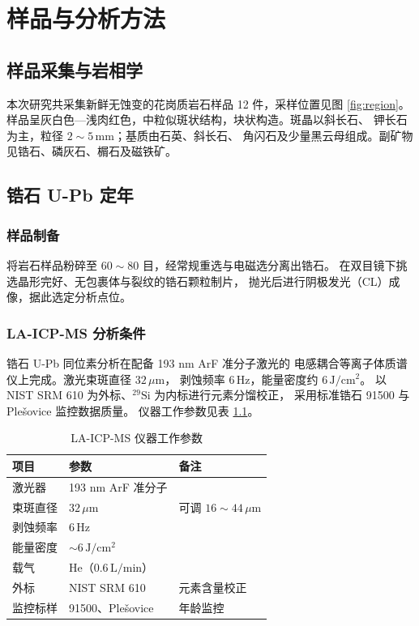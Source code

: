 \documentclass[master]{cugthesis}
\begin{document}
\chapter{样品与分析方法}

\section{样品采集与岩相学}

本次研究共采集新鲜无蚀变的花岗质岩石样品 12 件，采样位置见图 \ref{fig:region}。
样品呈灰白色—浅肉红色，中粒似斑状结构，块状构造。斑晶以斜长石、
钾长石为主，粒径 $2\sim5\,\mathrm{mm}$；基质由石英、斜长石、
角闪石及少量黑云母组成。副矿物见锆石、磷灰石、榍石及磁铁矿。

\section{锆石 U-Pb 定年}

\subsection{样品制备}

将岩石样品粉碎至 $60\sim80$ 目，经常规重选与电磁选分离出锆石。
在双目镜下挑选晶形完好、无包裹体与裂纹的锆石颗粒制片，
抛光后进行阴极发光（CL）成像，据此选定分析点位。

\subsection{LA-ICP-MS 分析条件}

锆石 U-Pb 同位素分析在配备 193 nm ArF 准分子激光的
电感耦合等离子体质谱仪上完成。激光束斑直径 $32\,\mu\mathrm{m}$，
剥蚀频率 $6\,\mathrm{Hz}$，能量密度约 $6\,\mathrm{J/cm^2}$。
以 NIST SRM 610 为外标、$^{29}\mathrm{Si}$ 为内标进行元素分馏校正，
采用标准锆石 91500 与 Plešovice 监控数据质量。
仪器工作参数见表 \ref{tab:condition}。

\begin{table}[htbp]
    \centering
    \caption{LA-ICP-MS 仪器工作参数}
    \label{tab:condition}
    \begin{tabular}{lll}
        \toprule
        项目 & 参数 & 备注 \\
        \midrule
        激光器 & 193 nm ArF 准分子 & \\
        束斑直径 & $32\,\mu\mathrm{m}$ & 可调 $16\sim44\,\mu\mathrm{m}$ \\
        剥蚀频率 & $6\,\mathrm{Hz}$ & \\
        能量密度 & $\sim 6\,\mathrm{J/cm^2}$ & \\
        载气 & He（$0.6\,\mathrm{L/min}$） & \\
        外标 & NIST SRM 610 & 元素含量校正 \\
        监控标样 & 91500、Plešovice & 年龄监控 \\
        \bottomrule
    \end{tabular}
\end{table}
\end{document}
